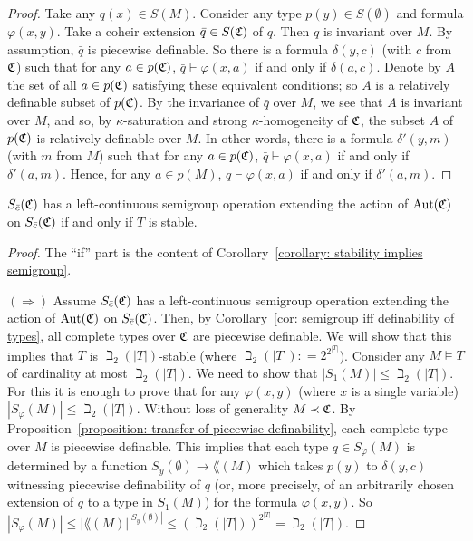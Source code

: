 	\begin{proof}
		Take any $q(x) \in S(M)$.
		Consider any type $p(y) \in S(\emptyset)$ and formula $\varphi(x,y)$.
		Take a coheir extension $\bar q \in S({\mathfrak C})$ of $q$. Then $q$ is invariant over $M$. By assumption, $\bar q$ is piecewise definable. So there is a formula $\delta(y,c)$ (with $c$ from ${\mathfrak C}$) such that for any $a \in p({\mathfrak C})$, $\bar q\vdash \varphi(x,a)$ if and only if $\delta(a,c)$. Denote by $A$ the set of all $a \in p({\mathfrak C})$ satisfying these equivalent conditions; so $A$ is a relatively definable subset of $p({\mathfrak C})$. By the invariance of $\bar q$ over $M$, we see that $A$ is invariant over $M$, and so, by $\kappa$-saturation and strong $\kappa$-homogeneity of ${\mathfrak C}$, the subset $A$ of $p({\mathfrak C})$ is relatively definable over $M$. In other words, there is a formula $\delta'(y,m)$ (with $m$ from $M$) such that for any $a \in p({\mathfrak C})$, $\bar q\vdash \varphi(x,a)$ if and only if $\delta'(a,m)$. Hence, for any $a \in p(M)$, $q\vdash \varphi(x,a)$ if and only if $\delta'(a,m)$.
	\end{proof}
	
	\begin{cor}\label{cor: semigroup = stability}
		$S_{\bar c}({\mathfrak C})$ has a left-continuous semigroup operation extending the action of $\operatorname{{Aut}}({\mathfrak C})$ on $S_{\bar c}({\mathfrak C})$ if and only if $T$ is stable.
	\end{cor}
	\begin{proof}
		The ``if'' part is the content of Corollary~\ref{corollary: stability implies semigroup}.
		
		$(\Rightarrow)$ Assume $S_{\bar c}({\mathfrak C})$ has a left-continuous semigroup operation extending the action of $\operatorname{{Aut}}({\mathfrak C})$ on $S_{\bar c}({\mathfrak C})$. Then, by Corollary~\ref{cor: semigroup iff definability of types}, all complete types over ${\mathfrak C}$ are piecewise definable. We will show that this implies that $T$ is $\beth_2(|T|)$-stable (where $\beth_2(|T|): = 2^{2^{|T|}}$). Consider any $M \models T$ of cardinality at most $\beth_2(|T|)$. We need to show that $|S_1(M)| \leq \beth_2(|T|)$. For this it is enough to prove that for any $\varphi(x,y)$ (where $x$ is a single variable) $|S_\varphi(M)| \leq \beth_2(|T|)$. Without loss of generality $M \prec {\mathfrak C}$.
		By Proposition~\ref{proposition: transfer of piecewise definability}, each complete type over $M$ is piecewise definable. This implies that each type $q \in S_\varphi(M)$ is determined by a function $S_y(\emptyset) \to \lang(M)$ which takes $p(y)$ to $\delta(y,c)$ witnessing piecewise definability of $q$ (or, more precisely, of an arbitrarily chosen extension of $q$ to a type in $S_1(M)$) for the formula $\varphi(x,y)$. So $|S_\varphi(M)| \leq |\lang(M)|^{|S_y(\emptyset)|} \leq (\beth_2(|T|))^{2^{|T|}}=\beth_2(|T|)$.
	\end{proof}
	
